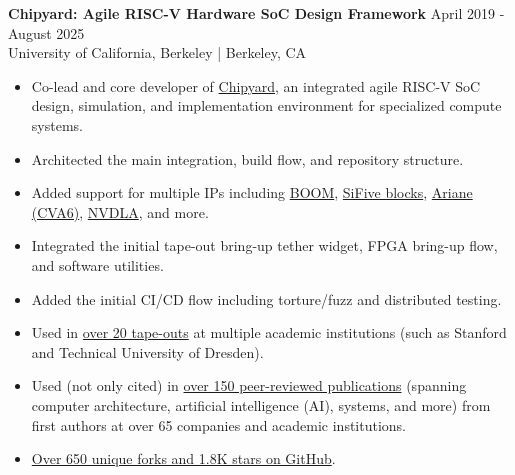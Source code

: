 \documentclass[line]{res}
\begin{document}
\begin{resume}
\label{sec:chipyard}
\textbf{Chipyard: Agile RISC-V Hardware SoC Design Framework} \hfill April 2019 - August 2025
\\
University of California, Berkeley | Berkeley, CA
\\
\vspace{-3mm}
\begin{itemize}
\item Co-lead and core developer of \href{https://github.com/ucb-bar/chipyard}{Chipyard}, an integrated agile RISC-V SoC design, simulation, and implementation environment for specialized compute systems.
\item Architected the main integration, build flow, and repository structure.
\item Added support for multiple IPs including \hyperref[sec:boom]{BOOM}, \href{https://github.com/chipsalliance/rocket-chip-blocks}{SiFive blocks}, \href{https://github.com/openhwgroup/cva6}{Ariane (CVA6)}, \href{https://nvdla.org/}{NVDLA}, and more.
\item Integrated the initial tape-out bring-up tether widget, FPGA bring-up flow, and software utilities.
\item Added the initial CI/CD flow including torture/fuzz and distributed testing.
\item Used in \href{https://scholar.google.com/scholar?cites=4549882523608568335&as_sdt=2005&sciodt=0,5&hl=en}{over 20 tape-outs} at multiple academic institutions (such as Stanford and Technical University of Dresden).
\item Used (not only cited) in \href{https://scholar.google.com/scholar?cites=4549882523608568335&as_sdt=2005&sciodt=0,5&hl=en}{over 150 peer-reviewed publications} (spanning computer architecture, artificial intelligence (AI), systems, and more) from first authors at over 65 companies and academic institutions.
\item \href{https://github.com/ucb-bar/chipyard}{Over 650 unique forks and 1.8K stars on GitHub}.
\end{itemize}

\vspace{-2mm}


\end{resume}
\end{document}
